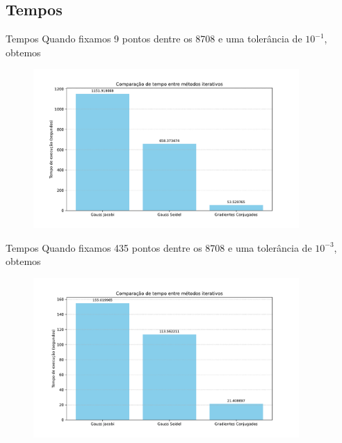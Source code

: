 \documentclass[11pt]{beamer}
\begin{document}
\subsection{Tempos}

\begin{frame}{Tempos}
    Quando fixamos 9 pontos dentre os 8708 e uma tolerância de $10^{-1}$, obtemos
    \begin{figure}[htb]
        \label{fig:tempos_iterativos_9pontos}
        \centering
        \includegraphics[width=0.9\textwidth]{../figs/fig6.pdf}
    \end{figure}
\end{frame}

\begin{frame}{Tempos}
    Quando fixamos 435 pontos dentre os 8708 e uma tolerância de $10^{-3}$, obtemos
    \begin{figure}[htb]
        \label{fig:tempos_iterativos_435pontos}
        \centering
        \includegraphics[width=0.9\textwidth]{../figs/fig12.pdf}
    \end{figure}
\end{frame}
\end{document}
